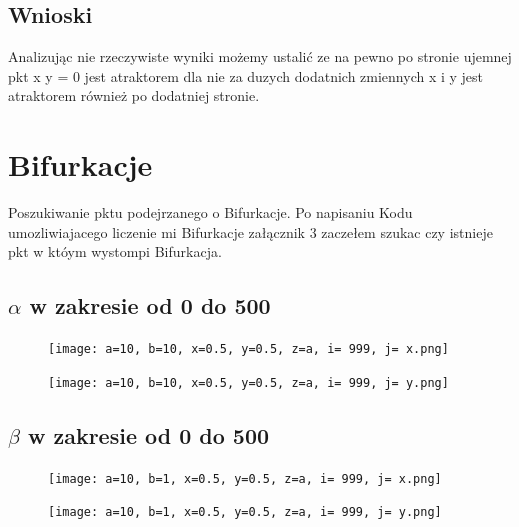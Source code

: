 \documentclass{article}
\begin{document}
    \subsection{Wnioski}
    Analizując nie rzeczywiste wyniki możemy ustalić ze na pewno po stronie ujemnej pkt x y = 0 jest atraktorem dla nie za duzych dodatnich zmiennych x i y jest atraktorem również po dodatniej stronie.


    \newpage
    \section{Bifurkacje}

    Poszukiwanie pktu podejrzanego o Bifurkacje.
    Po napisaniu Kodu umozliwiajacego liczenie mi Bifurkacje załącznik 3 zaczełem szukac czy istnieje pkt w któym wystompi Bifurkacja.

    \subsection{$\alpha$ w zakresie od 0 do 500}
    \begin{figure}[ht]
        \centering
        \begin{minipage}{.5\textwidth}
            \centering
            \texttt{[image: a=10, b=10, x=0.5, y=0.5, z=a, i= 999, j= x.png]}
            \label{fig:test11}
        \end{minipage}%
        \begin{minipage}{.5\textwidth}
            \centering
            \texttt{[image: a=10, b=10, x=0.5, y=0.5, z=a, i= 999, j= y.png]}
            \label{fig:test12}
        \end{minipage}
    \end{figure}

        \subsection{$\beta$ w zakresie od 0 do 500}
    \begin{figure}[ht]
        \centering
        \begin{minipage}{.5\textwidth}
            \centering
            \texttt{[image: a=10, b=1, x=0.5, y=0.5, z=a, i= 999, j= x.png]}
            \label{fig:test11}
        \end{minipage}%
        \begin{minipage}{.5\textwidth}
            \centering
            \texttt{[image: a=10, b=1, x=0.5, y=0.5, z=a, i= 999, j= y.png]}
            \label{fig:test12}
        \end{minipage}
    \end{figure}
\end{document}
